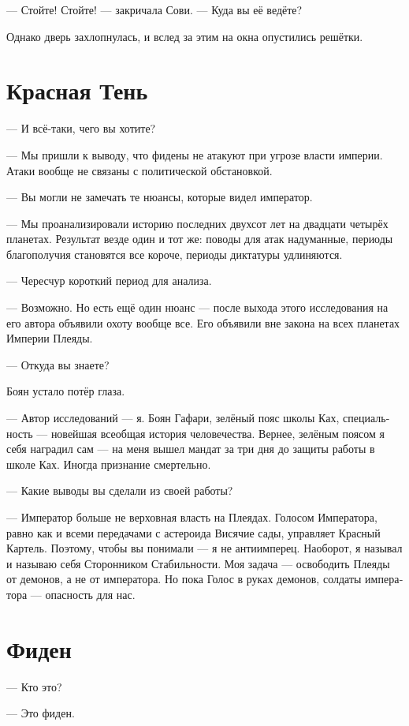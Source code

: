 \documentclass[a4paper,12pt,fleqn]{book}\usepackage{polyglossia}\setdefaultlanguage[babelshorthands=true]{russian}\setotherlanguage{english}\defaultfontfeatures{Ligatures=TeX,Mapping=tex-text}
\begin{document}
--- Стойте!
Стойте! --- закричала Сови.
--- Куда вы её ведёте?

Однако дверь захлопнулась, и вслед за этим на окна опустились решётки.

\section{Красная Тень}

--- И всё-таки, чего вы хотите?

--- Мы пришли к выводу, что фидены не атакуют при угрозе власти империи.
Атаки вообще не связаны с политической обстановкой.

--- Вы могли не замечать те нюансы, которые видел император.

--- Мы проанализировали историю последних двухсот лет на двадцати четырёх планетах.
Результат везде один и тот же: поводы для атак надуманные, периоды благополучия становятся все короче, периоды диктатуры удлиняются.

--- Чересчур короткий период для анализа.

--- Возможно.
Но есть ещё один нюанс --- после выхода этого исследования на его автора объявили охоту вообще все.
Его объявили вне закона на всех планетах Империи Плеяды.

--- Откуда вы знаете?

Боян устало потёр глаза.

--- Автор исследований --- я.
Боян Гафари, зелёный пояс школы Ках, специальность --- новейшая всеобщая история человечества.
Вернее, зелёным поясом я себя наградил сам --- на меня вышел мандат за три дня до защиты работы в школе Ках.
Иногда признание смертельно.

--- Какие выводы вы сделали из своей работы?

--- Император больше не верховная власть на Плеядах.
Голосом Императора, равно как и всеми передачами с астероида Висячие сады, управляет Красный Картель.
Поэтому, чтобы вы понимали --- я не антиимперец.
Наоборот, я называл и называю себя Сторонником Стабильности.
Моя задача --- освободить Плеяды от демонов, а не от императора.
Но пока Голос в руках демонов, солдаты императора --- опасность для нас.

\section{Фиден}

--- Кто это?

--- Это фиден.
\end{document}
